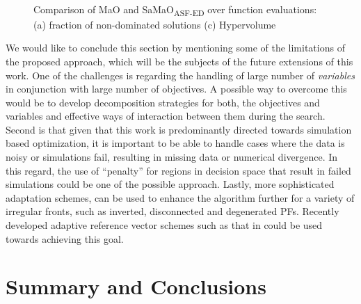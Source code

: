 \begin{figure}[!htb]
	\centering    
	\\
	\caption{Comparison of MaO and SaMaO\textsubscript{ASF-ED} over function evaluations: (a) fraction of non-dominated solutions (c) Hypervolume}
	\label{fig:nd}
\end{figure}


{\color{blue}
	We would like to conclude this section by mentioning some of the limitations of the proposed approach, which will be the subjects of the future extensions of this work. One of the challenges is regarding the handling of large number of \emph{variables} in conjunction with large number of objectives. A possible way to overcome this would be to develop decomposition strategies for both, the objectives and variables and effective ways of interaction between them during the search. Second is that given that this work is predominantly directed towards simulation based optimization, it is important to be able to handle cases where the data is noisy or simulations fail, resulting in missing data or numerical divergence. In this regard, the use of ``penalty'' for regions in decision space that result in failed simulations could be one of the possible approach. Lastly, more sophisticated adaptation schemes, can be used to enhance the algorithm further for a variety of irregular fronts, such as inverted, disconnected and degenerated PFs. Recently developed adaptive reference vector schemes such as that in \cite{asaf2017enhanced} could be used towards achieving this goal.  
}


\section{Summary and Conclusions}
\label{sec:KHTsec:5}

